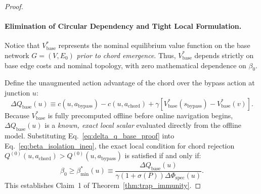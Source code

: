 \documentclass[11pt,a4paper]{article}
\begin{document}
\begin{proof}
\paragraph{Elimination of Circular Dependency and Tight Local Formulation.}
Notice that $V_{\text{base}}^*$ represents the nominal equilibrium value function on the base network $G = (V, E_0)$ \textit{prior to chord emergence}. Thus, $V_{\text{base}}^*$ depends strictly on base edge costs and nominal topology, with zero mathematical dependence on $\beta_0$.

Define the unaugmented action advantage of the chord over the bypass action at junction $u$:
\begin{equation}
\label{eq:delta_q_base_proof}
\Delta Q_{\text{base}}(u) \equiv c(u, a_{\text{bypass}}) - c(u, a_{\text{chord}}) + \gamma \left[ V_{\text{base}}^*(s_{\text{bypass}}) - V_{\text{base}}^*(v) \right].
\end{equation}
Because $V_{\text{base}}^*$ is fully precomputed offline before online navigation begins, $\Delta Q_{\text{base}}(u)$ is a \textit{known, exact local scalar} evaluated directly from the offline model. Substituting Eq.~\eqref{eq:delta_q_base_proof} into Eq.~\eqref{eq:beta_isolation_ineq}, the exact local condition for chord rejection $Q^{(0)}(u, a_{\text{chord}}) > Q^{(0)}(u, a_{\text{bypass}})$ is satisfied if and only if:
\begin{equation}
\beta_0 \ge \beta_{\min}^*(u) \equiv \frac{\Delta Q_{\text{base}}(u)}{\gamma (1 + \sigma(P)) \Delta \Phi_{\text{spec}}(u)}.
\end{equation}
This establishes Claim~1 of Theorem~\ref{thm:trap_immunity}.


\end{proof}
\end{document}
